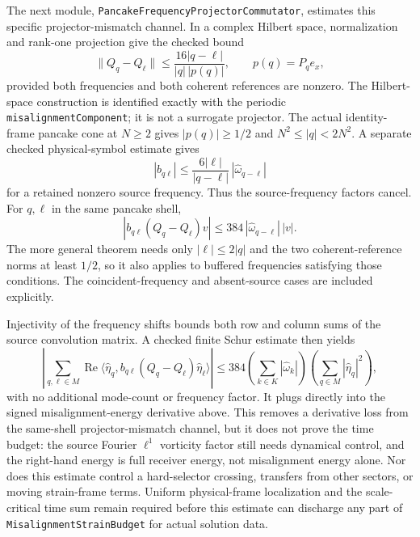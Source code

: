 \documentclass[11pt]{article}
\theoremstyle{definition}
\begin{document}
The next module, \texttt{PancakeFrequencyProjectorCommutator}, estimates
this specific projector-mismatch channel.  In a complex Hilbert space,
normalization and rank-one projection give the checked bound
\[
 \|Q_q-Q_\ell\|\le
   \frac{16|q-\ell|}{|q|\,|p(q)|},
 \qquad p(q)=P_qe_x,
\]
provided both frequencies and both coherent references are nonzero.
The Hilbert-space construction is identified exactly with the periodic
\texttt{misalignmentComponent}; it is not a surrogate projector.
The actual identity-frame pancake cone at $N\ge2$ gives
$|p(q)|\ge1/2$ and $N^2\le|q|<2N^2$.  A separate checked physical-symbol
estimate gives
\[
 |b_{q\ell}|\le
   \frac{6|\ell|}{|q-\ell|}\,|\widehat\omega_{q-\ell}|
\]
for a retained nonzero source frequency.  Thus the source-frequency factors
cancel.  For $q,\ell$ in the same pancake shell,
\[
 |b_{q\ell}(Q_q-Q_\ell)v|
   \le384\,|\widehat\omega_{q-\ell}|\,|v|.
\]
The more general theorem needs only $|\ell|\le2|q|$ and the two
coherent-reference norms at least $1/2$, so it also applies to buffered
frequencies satisfying those conditions.  The coincident-frequency and
absent-source cases are included explicitly.

Injectivity of the frequency shifts bounds both row and column sums of the
source convolution matrix.  A checked finite Schur estimate then yields
\[
 \left|\sum_{q,\ell\in M}\operatorname{Re}
   \langle\widehat\eta_q,b_{q\ell}(Q_q-Q_\ell)
     \widehat\eta_\ell\rangle\right|
 \le384\left(\sum_{k\in K}|\widehat\omega_k|\right)
          \left(\sum_{q\in M}|\widehat\eta_q|^2\right),
\]
with no additional mode-count or frequency factor.  It plugs directly into
the signed misalignment-energy derivative above.  This removes a derivative
loss from the same-shell projector-mismatch channel, but it does not prove
the time budget: the source Fourier $\ell^1$ vorticity factor still needs
dynamical control, and the right-hand energy is full receiver energy, not
misalignment energy alone.  Nor does this estimate control a hard-selector
crossing, transfers from other sectors, or moving strain-frame terms.
Uniform physical-frame localization and the scale-critical time sum remain
required before this estimate can discharge any part of
\texttt{MisalignmentStrainBudget} for actual solution data.
\end{document}
